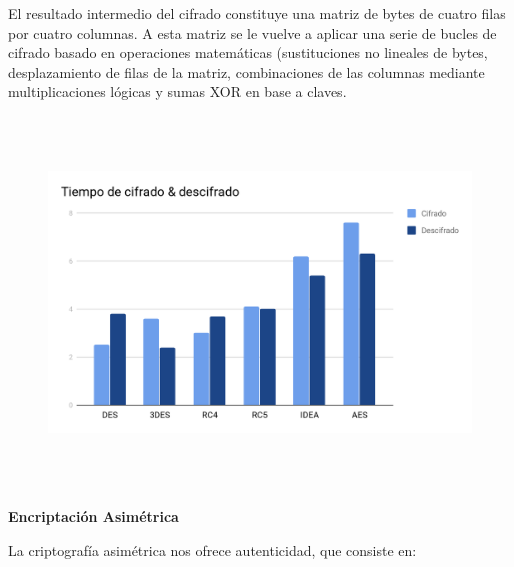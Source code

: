 \documentclass[12pt]{article}
\begin{document}
\vspace{\baselineskip}
\begin{justify}
El resultado intermedio del cifrado constituye una matriz de bytes de cuatro filas por cuatro columnas. A esta matriz se le vuelve a aplicar una serie de bucles de cifrado basado en operaciones matemáticas (sustituciones no lineales de bytes, desplazamiento de filas de la matriz, combinaciones de las columnas mediante multiplicaciones lógicas y sumas XOR en base a claves.
\end{justify}\par


\vspace{\baselineskip}



\begin{figure}[H]
	\begin{Center}
		\includegraphics[width=6.27in,height=3.88in]{./media/image2.png}
	\end{Center}
\end{figure}



\par


\vspace{\baselineskip}
\begin{Center}
\textbf{Encriptación Asimétrica}
\end{Center}\par


\vspace{\baselineskip}
\begin{justify}
La criptografía asimétrica nos ofrece autenticidad, que consiste en:
\end{justify}\par
\end{document}
